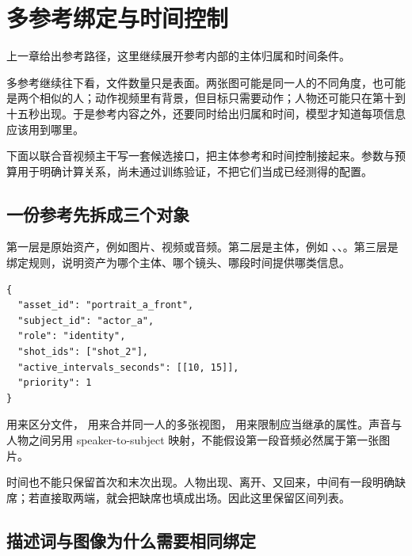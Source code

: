 \chapter{多参考绑定与时间控制}\label{seedance-m16}

上一章给出参考路径，这里继续展开参考内部的主体归属和时间条件。

多参考继续往下看，文件数量只是表面。两张图可能是同一人的不同角度，也可能是两个相似的人；动作视频里有背景，但目标只需要动作；人物还可能只在第十到十五秒出现。于是参考内容之外，还要同时给出归属和时间，模型才知道每项信息应该用到哪里。

下面以联合音视频主干写一套候选接口，把主体参考和时间控制接起来。参数与预算用于明确计算关系，尚未通过训练验证，不把它们当成已经测得的配置。

\section{一份参考先拆成三个对象}\label{seedance-m16-ux4e00ux4efdux53c2ux8003ux5148ux62c6ux6210ux4e09ux4e2aux5bf9ux8c61}

第一层是原始资产，例如图片、视频或音频。第二层是主体，例如 、、。第三层是绑定规则，说明资产为哪个主体、哪个镜头、哪段时间提供哪类信息。

\begin{verbatim}
{
  "asset_id": "portrait_a_front",
  "subject_id": "actor_a",
  "role": "identity",
  "shot_ids": ["shot_2"],
  "active_intervals_seconds": [[10, 15]],
  "priority": 1
}
\end{verbatim}

 用来区分文件， 用来合并同一人的多张视图， 用来限制应当继承的属性。声音与人物之间另用 speaker-to-subject 映射，不能假设第一段音频必然属于第一张图片。

时间也不能只保留首次和末次出现。人物出现、离开、又回来，中间有一段明确缺席；若直接取两端，就会把缺席也填成出场。因此这里保留区间列表。

\section{描述词与图像为什么需要相同绑定}\label{seedance-m16-ux63cfux8ff0ux8bcdux4e0eux56feux50cfux4e3aux4ec0ux4e48ux9700ux8981ux76f8ux540cux7ed1ux5b9a}

